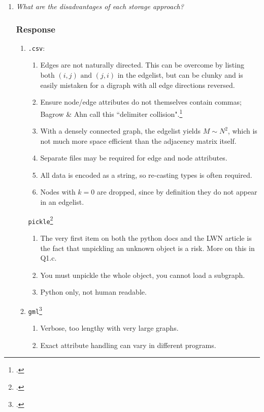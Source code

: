 \documentclass{article}
\newcommand{\AND}{\text{ and }}
\newcommand{\response}{\subsubsection*{Response}}
\begin{document}
\begin{enumerate}
\begin{enumerate}
\begin{enumerate}
        \end{enumerate}
    \end{enumerate}
    \item \textit{What are the disadvantages of each storage approach?}
    \response
    \begin{enumerate}
        \item[] \texttt{.csv}:
        \begin{enumerate}
            \item Edges are not naturally directed. This can be overcome by listing both $(i,j)\AND (j,i)$ in the edgelist, but can be clunky and is easily mistaken for a digraph with all edge directions reversed. 
            \item Ensure node/edge attributes do not themselves contain commas; Bagrow \& Ahn call this ``delimiter collision".\footcite{bagrow_working_2024}
            \item With a densely connected graph, the edgelist yields $M\sim N^2$, which is not much more space efficient than the adjacency matrix itself. 
            \item Separate files may be required for edge and node attributes.
            \item All data is encoded as a string, so re-casting types is often required. 
            \item Nodes with $k=0$ are dropped, since by definition they do not appear in an edgelist. 
        \end{enumerate}
        \texttt{pickle}\footcite{python-pickle,alden-pickles}
        \begin{enumerate}
            \item The very first item on both the python docs and the LWN article is the fact that unpickling an unknown object is a risk. More on this in Q1.c.
            \item You must unpickle the whole object, you cannot load a subgraph. 
            \item Python only, not human readable.
        \end{enumerate}
        \item[] \texttt{gml}\footcite{yworks-gml,passau-gml}
        \begin{enumerate}
            \item Verbose, too lengthy with very large graphs.
            \item Exact attribute handling can vary in different programs. 
        \end{enumerate}

\end{enumerate}
\end{enumerate}
\end{document}
